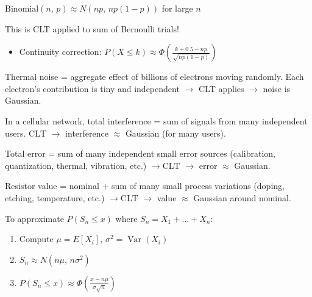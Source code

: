 
$\mathrm{Binomial}(n,\, p) \approx N(np,\, np(1-p))$ for large $n$

This is CLT applied to sum of Bernoulli trials!

\begin{itemize}
\tightlist
\item
  Continuity correction: $P(X \le k) \approx \Phi \left(\frac{k + 0.5 - np}{\sqrt{np(1-p)}}\right)$
\end{itemize}



Thermal noise = aggregate effect of billions of electrons moving randomly. Each electron’s contribution is tiny and independent \ensuremath{\to} CLT applies \ensuremath{\to} noise is Gaussian.


In a cellular network, total interference = sum of signals from many independent users. $\mathrm{CLT}$ \ensuremath{\to} interference \ensuremath{\approx} Gaussian (for many users).


Total error = sum of many independent small error sources (calibration, quantization, thermal, vibration, etc.) $\to \mathrm{CLT}$ \ensuremath{\to} error \ensuremath{\approx} Gaussian.


Resistor value = nominal + sum of many small process variations (doping, etching, temperature, etc.) $\to \mathrm{CLT}$ \ensuremath{\to} value \ensuremath{\approx} Gaussian around nominal.



To approximate $P(S_{n} \le x)$ where $S_{n} = X_{1} + \ldots + X_{n}$:

\begin{enumerate}
\def\labelenumi{\arabic{enumi}.}
\tightlist
\item
  Compute $\mu = E[X_{i}],\, \sigma^{2} = \operatorname{Var}(X_{i})$
\item
  $S_{n} \approx N(n\mu,\, n\sigma^{2})$
\item
  $\displaystyle P(S_{n} \le x) \approx \Phi \left(\frac{x - n\mu}{\sigma \sqrt{n}}\right)$
\end{enumerate}

